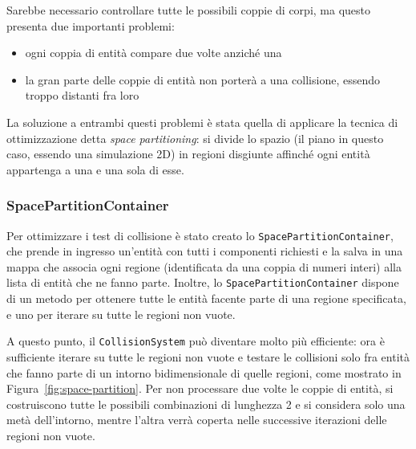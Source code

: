 Sarebbe necessario controllare tutte le possibili coppie di corpi, ma questo presenta due importanti problemi:
\begin{itemize}
    \item ogni coppia di entità compare due volte anziché una
    \item la gran parte delle coppie di entità non porterà a una collisione, essendo troppo distanti fra loro
\end{itemize}

La soluzione a entrambi questi problemi è stata quella di applicare la tecnica di ottimizzazione detta
\textit{space partitioning}: si divide lo spazio (il piano in questo caso, essendo una simulazione 2D) in regioni disgiunte
affinché ogni entità appartenga a una e una sola di esse.

\subsubsection{SpacePartitionContainer}
Per ottimizzare i test di collisione è stato creato lo \texttt{SpacePartitionContainer}, che prende in ingresso
un'entità con tutti i componenti richiesti e la salva in una mappa che associa ogni regione (identificata da una coppia
di numeri interi) alla lista di entità che ne fanno parte.
Inoltre, lo \texttt{SpacePartitionContainer} dispone di un metodo per ottenere tutte le entità facente parte di una regione
specificata, e uno per iterare su tutte le regioni non vuote.

A questo punto, il \texttt{CollisionSystem} può diventare molto più efficiente: ora è sufficiente iterare su tutte le regioni
non vuote e testare le collisioni solo fra entità che fanno parte di un intorno bidimensionale di quelle regioni, come
mostrato in Figura~\ref{fig:space-partition}.
Per non processare due volte le coppie di entità, si costruiscono tutte le possibili combinazioni di lunghezza 2 e si
considera solo una metà dell'intorno, mentre l'altra verrà coperta nelle successive iterazioni delle regioni non vuote.

